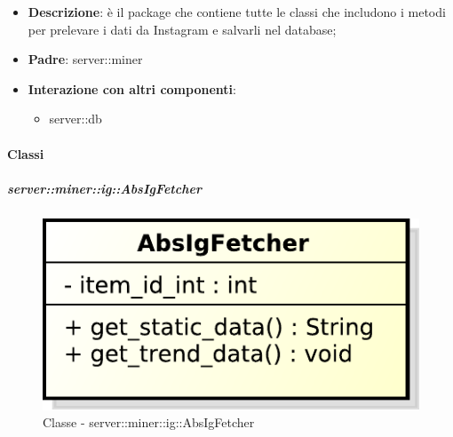 \begin{itemize}
  \item \textbf{Descrizione}: è il package che contiene tutte le classi che includono i metodi per prelevare i dati da Instagram e salvarli nel database;
  \item \textbf{Padre}: server::miner
   \item \textbf{Interazione con altri componenti}:
  	\begin{itemize}
  		\item server::db
  	\end{itemize}
\end{itemize}

	\paragraph{Classi} %
	\subparagraph{server::miner::ig::AbsIgFetcher} %
		\label{subp:server_miner_ig_AbsIgFetcher}
		    \begin{figure}[!htbp]
 		 		\centering
 				\centerline{\includegraphics[scale=0.75]{./images/server/classes/miner/abs_ig_fetcher.pdf}}
 				\caption{Classe - server::miner::ig::AbsIgFetcher}
			\end{figure}
